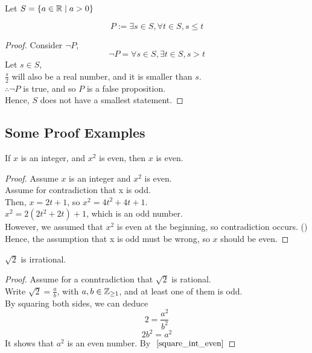 \documentclass[a4paper]{article}
\begin{document}
Let $S = \{a \in \mathbb{R} \mid a > 0\}$
\begin{prop}
$$P := \exists s \in S, \forall t \in S, s \leq t$$
\end{prop}
\begin{proof}
Consider $\neg P$,
$$\neg P = \forall s \in S, \exists t \in S, s > t$$
Let $s \in S$,\\
$\frac{s}{2}$ will also be a real number, and it is smaller than $s$.\\
$\therefore \neg P$ is true, and so $P$ is a false proposition.\\
Hence, $S$ does not have a smallest statement.
\end{proof}

\subsection{Some Proof Examples}
\begin{nlemma}\label{square_int_even}
If $x$ is an integer, and $x^2$ is even, then $x$ is even.
\end{nlemma}
\begin{proof}
Assume $x$ is an integer and $x^2$ is even.\\
Assume for contradiction that x is odd.\\
Then, $x = 2t + 1$, so $x^2 = 4t^2 + 4t + 1$.\\
$x^2 = 2(2t^2 + 2t) + 1$, which is an odd number.\\
However, we assumed that $x^2$ is even at the beginning, so contradiction occurs. (\contradiction)\\
Hence, the assumption that x is odd must be wrong, so $x$ should be even.
\end{proof}

\begin{nlemma}
$\sqrt{2}$ is irrational.
\end{nlemma}
\begin{proof}
Assume for a conntradiction that $\sqrt{2}$ is rational.\\
Write $\sqrt{2} = \frac{a}{b}$, with $a,b \in \mathbb{Z}_{\geq1}$, and at least one of them is odd.\\
By squaring both sides, we can deduce$$2 = \frac{a^2}{b^2}$$
$$2b^2 = a^2$$
It shows that $a^2$ is an even number. By $~\cref{square_int_even}$

\end{proof}
\end{document}
